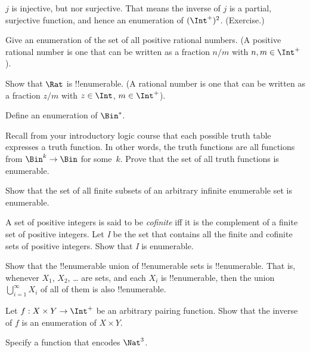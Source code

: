 \documentclass[../../../include/open-logic-section]{subfiles}
\begin{document}
\begin{explain}
$j$ is injective, but nor surjective.  That means the inverse of $j$ is a partial, surjective function, and hence an enumeration of $(\Int^+)^2$. (Exercise.)
\end{explain}

\begin{prob}
Give an enumeration of the set of all positive rational numbers. (A
positive rational number is one that can be written as a fraction
$n/m$ with $n, m \in \Int^+$).
\end{prob}

\begin{prob}
Show that $\Rat$ is !!{enumerable}. (A rational number is one that can
be written as a fraction $z/m$ with $z \in \Int$, $m \in \Int^+$).
\end{prob}

\begin{prob}
Define an enumeration of $\Bin^*$.
\end{prob}

\begin{prob}
Recall from your introductory logic course that each possible truth
table expresses a truth function. In other words, the truth functions
are all functions from $\Bin^k \to \Bin$ for some~$k$. Prove that the
set of all truth functions is enumerable.
\end{prob}

\begin{prob}
Show that the set of all finite subsets of an arbitrary infinite
enumerable set is enumerable.
\end{prob}

\begin{prob}
A set of positive integers is said to be \emph{cofinite} iff
it is the complement of a finite set of positive integers. Let
\emph{I} be the set that contains all the finite and cofinite sets of
positive integers. Show that \emph{I} is enumerable.
\end{prob}

\begin{prob}
Show that the !!{enumerable} union of !!{enumerable} sets is
!!{enumerable}. That is, whenever $X_1$, $X_2$, \dots{} are sets, and
each $X_i$ is !!{enumerable}, then the union $\bigcup_{i=1}^\infty
X_i$ of all of them is also !!{enumerable}.
\end{prob}

\begin{prob}
Let $f: X \times Y \to \Int^+$ be an arbitrary pairing function. Show that the inverse of $f$ is an enumeration of $X \times Y$.
\end{prob}

\begin{prob}
Specify a function that encodes $\Nat^3$.
\end{prob}
\end{document}
